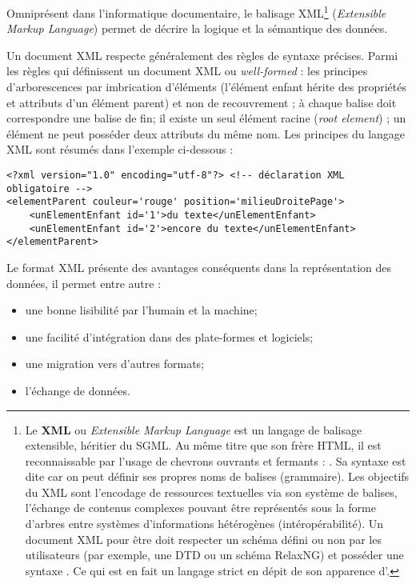 Omniprésent dans l'informatique documentaire, le balisage XML\footnote{Le \textbf{XML} ou \textit{Extensible Markup Language} est un langage de balisage extensible, héritier du SGML. Au même titre que son frère HTML, il est reconnaissable par l'usage de chevrons ouvrants et fermants : \citecode{< >}. Sa syntaxe est dite  car on peut définir ses propres noms de balises (grammaire). Les objectifs du XML sont l'encodage de ressources textuelles via son système de balises, l'échange de contenus complexes pouvant être représentés sous la forme d'arbres entre systèmes d'informations hétérogènes (intéropérabilité). Un document XML pour être  doit respecter un schéma défini ou non par les utilisateurs (par exemple, une DTD ou un schéma RelaxNG) et posséder une syntaxe . Ce qui est en fait un langage strict en dépit de son apparence d'.} (\textit{Extensible Markup Language}) permet de décrire la logique et la sémantique des données. 

Un document XML respecte généralement des règles de syntaxe précises. Parmi les règles qui définissent un document XML  ou \textit{well-formed} : les principes d'arborescences par imbrication d'éléments (l'élément enfant hérite des propriétés et attributs d'un élément parent) et non de recouvrement ; à chaque balise doit correspondre une balise de fin; il existe un seul élément racine (\textit{root element}) ; un élément ne peut posséder deux attributs du même nom. Les principes du langage XML sont résumés dans l'exemple ci-dessous : \\

\lstset{language=XML}
\begin{lstlisting}
<?xml version="1.0" encoding="utf-8"?> <!-- déclaration XML obligatoire -->
<elementParent couleur='rouge' position='milieuDroitePage'>
    <unElementEnfant id='1'>du texte</unElementEnfant>
    <unElementEnfant id='2'>encore du texte</unElementEnfant>
</elementParent>
\end{lstlisting} 
Le format XML présente des avantages conséquents dans la représentation des données, il permet entre autre :
\begin{itemize}
    \item une bonne lisibilité par l'humain et la machine;
    \item une facilité d'intégration dans des plate-formes et logiciels;
    \item une migration vers d'autres formats;
    \item l'échange de données.
\end{itemize}


